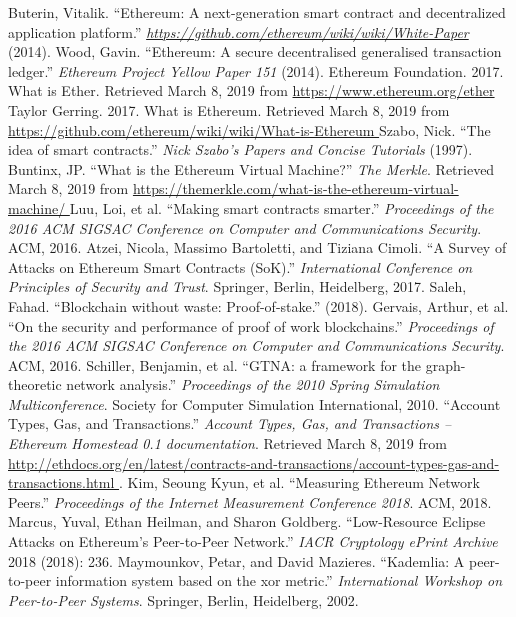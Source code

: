 \documentclass[10pt,conference,final]{IEEEtran}
\begin{document}

\begin{thebibliography}{99}
Buterin, Vitalik. ``Ethereum: A next-generation smart contract and decentralized application platform.'' \emph{\url{https://github.com/ethereum/wiki/wiki/White-Paper }} (2014).
Wood, Gavin. ``Ethereum: A secure decentralised generalised transaction ledger.'' \emph{Ethereum Project Yellow Paper 151} (2014).
Ethereum Foundation. 2017. What is Ether. Retrieved March 8, 2019 from \url{https://www.ethereum.org/ether }
Taylor Gerring. 2017. What is Ethereum. Retrieved March 8, 2019 from \url{https://github.com/ethereum/wiki/wiki/What-is-Ethereum }
Szabo, Nick. ``The idea of smart contracts.'' \emph{Nick Szabo's Papers and Concise Tutorials} (1997).
Buntinx, JP. ``What is the Ethereum Virtual Machine?'' \emph{The Merkle}. Retrieved March 8, 2019 from \url{https://themerkle.com/what-is-the-ethereum-virtual-machine/ }
Luu, Loi, et al. ``Making smart contracts smarter.'' \emph{Proceedings of the 2016 ACM SIGSAC Conference on Computer and Communications Security}. ACM, 2016.
Atzei, Nicola, Massimo Bartoletti, and Tiziana Cimoli. ``A Survey of Attacks on Ethereum Smart Contracts (SoK).'' \emph{International Conference on Principles of Security and Trust}. Springer, Berlin, Heidelberg, 2017.
Saleh, Fahad. ``Blockchain without waste: Proof-of-stake.'' (2018).
Gervais, Arthur, et al. ``On the security and performance of proof of work blockchains.'' \emph{Proceedings of the 2016 ACM SIGSAC Conference on Computer and Communications Security}. ACM, 2016.
Schiller, Benjamin, et al. ``GTNA: a framework for the graph-theoretic network analysis.'' \emph{Proceedings of the 2010 Spring Simulation Multiconference}. Society for Computer Simulation International, 2010.
``Account Types, Gas, and Transactions.'' \emph{Account Types, Gas, and Transactions -- Ethereum Homestead 0.1 documentation}. Retrieved March 8, 2019 from \url{http://ethdocs.org/en/latest/contracts-and-transactions/account-types-gas-and-transactions.html }.
Kim, Seoung Kyun, et al. ``Measuring Ethereum Network Peers.'' \emph{Proceedings of the Internet Measurement Conference 2018}. ACM, 2018.
Marcus, Yuval, Ethan Heilman, and Sharon Goldberg. ``Low-Resource Eclipse Attacks on Ethereum's Peer-to-Peer Network.'' \emph{IACR Cryptology ePrint Archive} 2018 (2018): 236.
Maymounkov, Petar, and David Mazieres. ``Kademlia: A peer-to-peer information system based on the xor metric.'' \emph{International Workshop on Peer-to-Peer Systems}. Springer, Berlin, Heidelberg, 2002.

\end{thebibliography}
\end{document}
